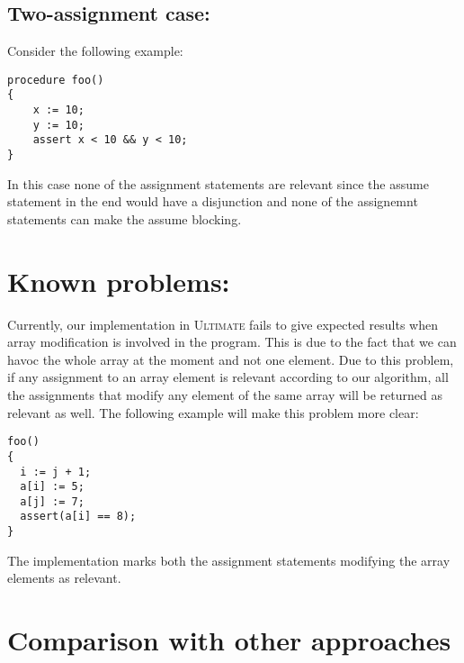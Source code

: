 \documentclass{article}
\newcommand{\ultimate}{\textsc{Ultimate}\xspace} %
\begin{document}
\subsection{Two-assignment case:}
Consider the following example:
\begin{lstlisting}
procedure foo()
{
    x := 10;
    y := 10;
    assert x < 10 && y < 10;
}
\end{lstlisting}
In this case none of the assignment statements are relevant since the assume statement in the end would have a disjunction and none of the assignemnt statements can make the assume blocking. 
\section{Known problems:}
Currently, our implementation in \ultimate fails to give expected results when array modification is involved in the program. This is due to the fact that we can havoc the whole array at the moment and not one element. Due to this problem, if any assignment to an array element is relevant according to our algorithm, all the assignments that modify any element of the same array will be returned as relevant as well. The following example will make this problem more clear:
\begin{lstlisting}
foo()
{ 
  i := j + 1;
  a[i] := 5;
  a[j] := 7;
  assert(a[i] == 8);
}
\end{lstlisting}
The implementation marks both the assignment statements modifying the array elements as relevant.

\section{Comparison with other approaches}
\end{document}
